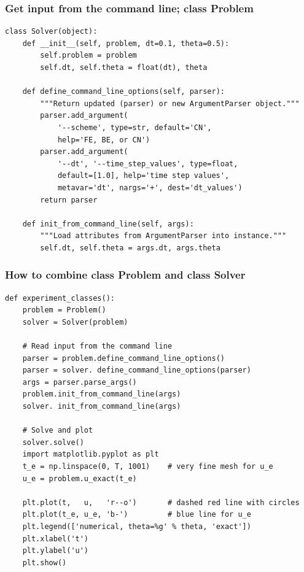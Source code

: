 \documentclass{beamer}
\begin{document}
\begin{frame}
\frametitle{Get input from the command line; class Problem}

\begin{verbatim}
class Solver(object):
    def __init__(self, problem, dt=0.1, theta=0.5):
        self.problem = problem
        self.dt, self.theta = float(dt), theta

    def define_command_line_options(self, parser):
        """Return updated (parser) or new ArgumentParser object."""
        parser.add_argument(
            '--scheme', type=str, default='CN',
            help='FE, BE, or CN')
        parser.add_argument(
            '--dt', '--time_step_values', type=float,
            default=[1.0], help='time step values',
            metavar='dt', nargs='+', dest='dt_values')
        return parser

    def init_from_command_line(self, args):
        """Load attributes from ArgumentParser into instance."""
        self.dt, self.theta = args.dt, args.theta
\end{verbatim}
\end{frame}

\begin{frame}
\frametitle{How to combine class Problem and class Solver}

\begin{verbatim}
def experiment_classes():
    problem = Problem()
    solver = Solver(problem)

    # Read input from the command line
    parser = problem.define_command_line_options()
    parser = solver. define_command_line_options(parser)
    args = parser.parse_args()
    problem.init_from_command_line(args)
    solver. init_from_command_line(args)

    # Solve and plot
    solver.solve()
    import matplotlib.pyplot as plt
    t_e = np.linspace(0, T, 1001)    # very fine mesh for u_e
    u_e = problem.u_exact(t_e)

    plt.plot(t,   u,   'r--o')       # dashed red line with circles
    plt.plot(t_e, u_e, 'b-')         # blue line for u_e
    plt.legend(['numerical, theta=%g' % theta, 'exact'])
    plt.xlabel('t')
    plt.ylabel('u')
    plt.show()
\end{verbatim}
\end{frame}
\end{document}
